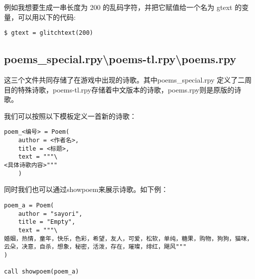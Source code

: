 例如我想要生成一串长度为 200 的乱码字符，并把它赋值给一个名为 gtext 的变量，可以用以下的代码:
\begin{lstlisting}
$ gtext = glitchtext(200)
\end{lstlisting}

\subsection{poems\_special.rpy\textbackslash poems-tl.rpy\textbackslash poems.rpy}

这三个文件共同存储了在游戏中出现的诗歌。其中poems\_special.rpy 定义了二周目的特殊诗歌，poems-tl.rpy存储着中文版本的诗歌，poems.rpy则是原版的诗歌。

我们可以按照以下模板定义一首新的诗歌：
\begin{lstlisting}
poem_<编号> = Poem(
    author = <作者名>,
    title = <标题>,
    text = """\
<具体诗歌内容>"""
    )
\end{lstlisting}

同时我们也可以通过showpoem来展示诗歌。如下例：
\begin{lstlisting}
poem_a = Poem(
    author = "sayori",
    title = "Empty",
    text = """\
婚姻，热情，童年，快乐，色彩，希望，友人，可爱，松软，单纯，糖果，购物，狗狗，猫咪，云朵，决意，自杀，想象，秘密，活泼，存在，璀璨，绯红，飓风"""
)

call showpoem(poem_a)
\end{lstlisting}